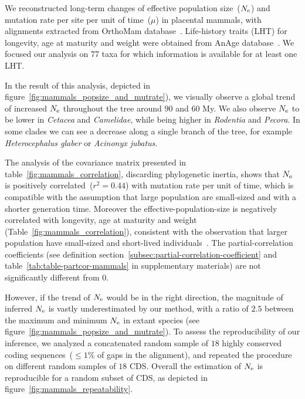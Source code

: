 We reconstructed long-term changes of effective population size~($N_{\mathrm{e}}$) and mutation rate per site per unit of time~($\mu$) in placental mammals, with alignments extracted from OrthoMam database~\citep{Ranwez2007,Scornavacca2019}.
Life-history traits (LHT) for longevity, age at maturity and weight were obtained from AnAge database~\citep{DEMAGALHAES2009,Tacutu2012}.
We focused our analysis on 77 taxa for which information is available for at least one LHT.

In the result of this analysis, depicted in figure~\ref{fig:mammals_popsize_and_mutrate}), we visually observe a global trend of increased $N_{\mathrm{e}}$ throughout the tree around $90$ and $60$ My.
We also observe $N_{\mathrm{e}}$ to be lower in \textit{Cetacea} and \textit{Camelidae}, while being higher in \textit{Rodentia} and \textit{Pecora}.
In some clades we can see a decrease along a single branch of the tree, for example \textit{Heterocephalus glaber} or \textit{Acinonyx jubatus}.

The analysis of the covariance matrix presented in table~\ref{fig:mammals_correlation}, discarding phylogenetic inertia, shows that $N_{\mathrm{e}}$ is positively correlated~($r^2 = 0.44$) with mutation rate per unit of time, which is compatible with the assumption that large population are small-sized and with a shorter generation time.
Moreover the \gls{effective-population-size} is negatively correlated with longevity, age at maturity and weight (Table~\ref{fig:mammals_correlation}), consistent with the observation that larger population have small-sized and short-lived individuals~\citep{Galtier2016,Romiguier2014}.
The partial-correlation coefficients (see definition section~\ref{subsec:partial-correlation-coefficient} and table~\ref{tab:table-partcor-mammals} in supplementary materials) are not significantly different from $0$.

However, if the trend of $N_{\mathrm{e}}$ would be in the right direction, the magnitude of inferred $N_{\mathrm{e}}$ is vastly underestimated by our method, with a ratio of $2.5$ between the maximum and minimum $N_{\mathrm{e}}$ in extant species (see figure~\ref{fig:mammals_popsize_and_mutrate}).
To assess the reproducibility of our inference, we analyzed a concatenated random sample of $18$ highly conserved coding sequences~($\leq 1\%$ of gaps in the alignment), and repeated the procedure on different random samples of $18$ CDS.
Overall the estimation of $N_{\mathrm{e}}$ is reproducible for a random subset of CDS, as depicted in figure~\ref{fig:mammals_repeatability}.

